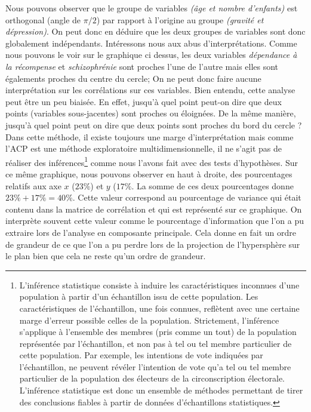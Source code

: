 Nous pouvons observer que le groupe de variables \textit{(âge et nombre d'enfants)} est orthogonal (angle de $\pi/2$) par rapport à l'origine au groupe \textit{(gravité et dépression)}. On peut donc en déduire que les deux groupes de variables sont donc globalement indépendants.\newline
Intéressons nous aux abus d'interprétations. Comme nous pouvons le voir sur le graphique ci dessus, les deux variables \textit{dépendance à la récompense} et \textit{schizophrénie} sont proches l'une de l'autre mais elles sont égalements proches du centre du cercle; On ne peut donc faire aucune interprétation sur les corrélations sur ces variables.\newline
Bien entendu, cette analyse peut être un peu biaisée. En effet, jusqu'à quel point peut-on dire que deux points (variables sous-jacentes) sont proches ou éloignées. De la même manière, jusqu'à quel point peut on dire que deux points sont proches du bord du cercle ? Dans cette méthode, il existe toujours une marge d'interprétation mais comme l'ACP est une méthode exploratoire multidimensionnelle, il ne s'agit pas de réaliser des inférences\footnote{L'inférence statistique consiste à induire les caractéristiques inconnues d'une population à partir d'un échantillon issu de cette population. Les caractéristiques de l'échantillon, une fois connues, reflètent avec une certaine marge d'erreur possible celles de la population. Strictement, l'inférence s'applique à l'ensemble des membres (pris comme un tout) de la population représentée par l'échantillon, et non pas à tel ou tel membre particulier de cette population. Par exemple, les intentions de vote indiquées par l'échantillon, ne peuvent révéler l'intention de vote qu'a tel ou tel membre particulier de la population des électeurs de la circonscription électorale. L'inférence statistique est donc un ensemble de méthodes permettant de tirer des conclusions fiables à partir de données d'échantillons statistiques.} comme nous l'avons fait avec des tests d'hypothèses.\newline
Sur ce même graphique, nous pouvons observer en haut à droite, des pourcentages relatifs aux axe $x$ ($23\%$) et $y$ ($17\%$. La somme de ces deux pourcentages donne $23\% + 17\% = 40 \%$. Cette valeur correspond au pourcentage de variance qui était contenu dans la matrice de corrélation et qui est représenté sur ce graphique.\newline
On interprète souvent cette valeur comme le pourcentage d'information que l'on a pu extraire lors de l'analyse en composante principale. Cela donne en fait un ordre de grandeur de ce que l'on a pu perdre lors de la projection de l'hypersphère sur le plan bien que cela ne reste qu'un ordre de grandeur.\newline
